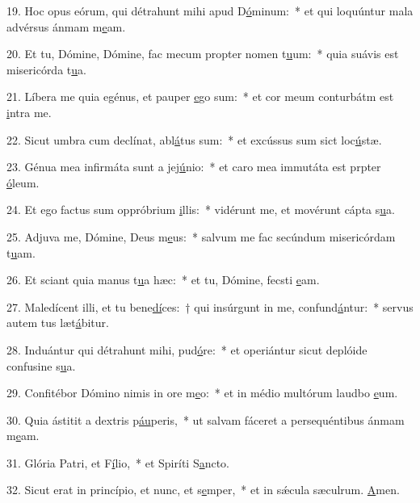 19. Hoc opus eórum, qui détrahunt mihi apud D\uline{ó}minum:~* et qui loquúntur mala advérsus ánmam m\uline{e}am.\par 
20. Et tu, Dómine, Dómine, fac mecum propter nomen t\uline{u}um:~* quia suávis est misericórda t\uline{u}a.\par 
21. Líbera me quia egénus, et pauper \uline{e}go sum:~* et cor meum conturbátm est \uline{i}ntra me.\par 
22. Sicut umbra cum declínat, abl\uline{á}tus sum:~* et excússus sum sict loc\uline{ú}stæ.\par 
23. Génua mea infirmáta sunt a jej\uline{ú}nio:~* et caro mea immutáta est prpter \uline{ó}leum.\par 
24. Et ego factus sum oppróbrium \uline{i}llis:~* vidérunt me, et movérunt cápta s\uline{u}a.\par 
25. Adjuva me, Dómine, Deus m\uline{e}us:~* salvum me fac secúndum misericórdam t\uline{u}am.\par 
26. Et sciant quia manus t\uline{u}a hæc:~* et tu, Dómine, fecsti \uline{e}am.\par 
27. Maledícent illi, et tu bene\uline{dí}ces:~† qui insúrgunt in me, confund\uline{á}ntur:~* servus autem tus læt\uline{á}bitur.\par 
28. Induántur qui détrahunt mihi, pud\uline{ó}re:~* et operiántur sicut deplóide confusine s\uline{u}a.\par 
29. Confitébor Dómino nimis in ore m\uline{e}o:~* et in médio multórum laudbo \uline{e}um.\par 
30. Quia ástitit a dextris p\uline{áu}peris,~* ut salvam fáceret a persequéntibus ánmam m\uline{e}am.\par 
31. Glória Patri, et F\uline{í}lio,~* et Spiríti S\uline{a}ncto.\par 
32. Sicut erat in princípio, et nunc, et s\uline{e}mper,~* et in sǽcula sæculrum. \uline{A}men.\par 
